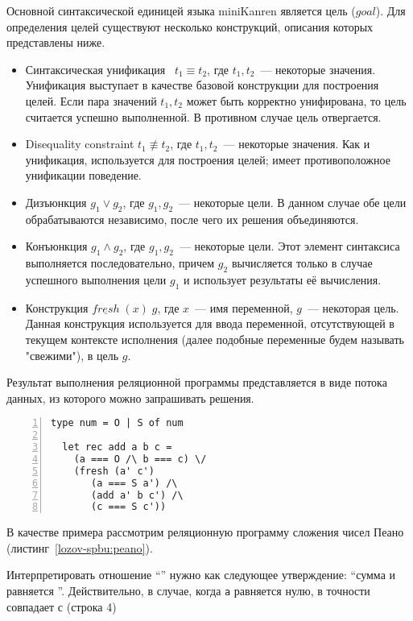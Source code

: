Основной синтаксической единицей языка miniKanren является цель ($goal$). Для определения целей существуют несколько конструкций, описания которых представлены ниже.
\begin{itemize}
\item Синтаксическая унификация~\cite{lozov-spbu:Unify} $t_1 \equiv t_2$, где $t_1, t_2$~--- некоторые значения. Унификация выступает в качестве базовой конструкции для построения целей. Если пара значений $t_1, t_2$ может быть корректно унифирована, то цель считается успешно выполненной. В противном случае цель отвергается.
\item Disequality constraint $t_1 \not \equiv t_2$, где $t_1, t_2$~--- некоторые значения. Как и унификация, используется для построения целей; имеет противоположное унификации поведение.
\item Дизъюнкция $g_1 \vee g_2$, где $g_1, g_2$~--- некоторые цели. В данном случае обе цели обрабатываются независимо, после чего их решения объединяются.
\item Конъюнкция $g_1 \wedge g_2$, где $g_1, g_2$~--- некоторые цели. Этот элемент синтаксиса выполняется последовательно, причем $g_2$ вычисляется только в случае успешного выполнения цели $g_1$ и использует результаты её вычисления.
\item Конструкция $\underline{fresh} \; (x) \; g$, где $x$~--- имя переменной, $g$~--- некоторая цель. Данная конструкция используется для ввода переменной, отсутствующей в текущем контексте исполнения (далее подобные переменные будем называть "свежими"), в цель $g$. 
\end{itemize}

Результат выполнения реляционной программы представляется в виде потока данных, из которого можно запрашивать решения.

\begin{lstlisting}[numbers=left,numberstyle=\small,stepnumber=1,numbersep=-5pt,caption={Сложение чисел Пеано},label={lozov-spbu:peano},captionpos=b]
  type num = O | S of num

  let rec add a b c =
    (a === O /\ b === c) \/
    (fresh (a' c')
       (a === S a') /\
       (add a' b c') /\
       (c === S c'))
\end{lstlisting}

В качестве примера рассмотрим реляционную программу сложения чисел Пеано (листинг~\ref{lozov-spbu:peano}).

Интерпретировать отношение ``\code{add a b c}'' нужно как следующее утверждение: ``сумма \code{a} и  равняется ''. Действительно, в случае, когда \lstinline{a} равняется нулю,  в точности совпадает с  (строка 4)

